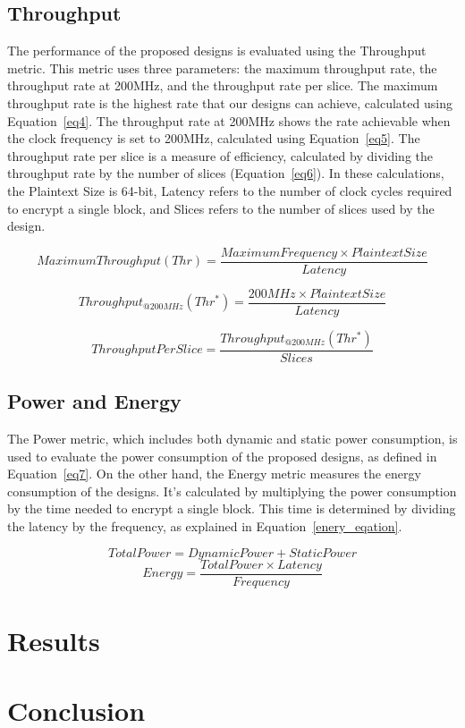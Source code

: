 \documentclass[sn-basic]{sn-jnl}%
\begin{document}
\subsection{Throughput}\label{subsec6}
The performance of the proposed designs is evaluated using the Throughput metric. This metric uses three parameters: the maximum throughput rate, the throughput rate at 200MHz, and the throughput rate per slice.
The maximum throughput rate is the highest rate that our designs can achieve, calculated using Equation~\ref{eq4}.
The throughput rate at 200MHz shows the rate achievable when the clock frequency is set to 200MHz, calculated using Equation~\ref{eq5}.
The throughput rate per slice is a measure of efficiency, calculated by dividing the throughput rate by the number of slices (Equation~\ref{eq6}).
In these calculations, the Plaintext Size is 64-bit, Latency refers to the number of clock cycles required to encrypt a single block, and Slices refers to the number of slices used by the design.

\begin{equation}
    Maximum Throughput(Thr) = \frac{Maximum Frequency \times Plaintext Size}{Latency}
    \label{eq4}
\end{equation}

\begin{equation}
    Throughput_{@200MHz}(Thr^*) = \frac{200MHz \times Plaintext Size}{Latency}
    \label{eq5}
\end{equation}

\begin{equation}
    ThroughputPerSlice = \frac{Throughput_{@200MHz}(Thr^*)}{Slices}
    \label{eq6}
\end{equation}

\subsection{Power and Energy}\label{power_energy}

The Power metric, which includes both dynamic and static power consumption, is used to evaluate the power consumption of the proposed designs, as defined in Equation~\ref{eq7}.
On the other hand, the Energy metric measures the energy consumption of the designs. It's calculated by multiplying the power consumption by the time needed to encrypt a single block. This time is determined by dividing the latency by the frequency, as explained in Equation~\ref{enery_eqation}.

\begin{equation}
    Total Power = Dynamic  Power + Static Power
    \label{eq7}
\end{equation}
\begin{equation}
    Energy = \frac{Total Power \times Latency }{Frequency}
    \label{enery_eqation}
\end{equation}




\section{Results}\label{sec5}


\section{Conclusion}\label{sec6}

\end{document}
